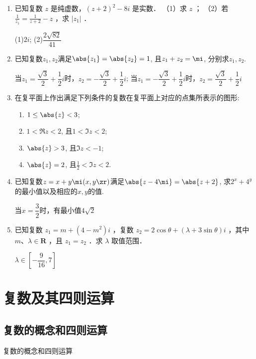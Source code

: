 \begin{enumerate}
\item 已知复数 $z$ 是纯虚数，$(z+2)^2-8 i$ 是实数．
（1）求 $z$ ；
（2）若 $\frac{1}{z_1}=\frac{1}{z+2}-z$ ，求 $\left|z_1\right|$ ．
\begin{jieda}
    (1)$2i$; (2)$\dfrac{2\sqrt{82}}{41}$
\end{jieda}

\item 已知复数$z_1,z_2$满足$\abs{z_1}=\abs{z_2}=1$, 且$z_1+z_2=\mi$, 分别求$z_1,z_2$. 
\begin{jieda}
    当$z_1=\dfrac{\sqrt{3}}{2}+\dfrac{1}{2}i$时，$z_2=-\dfrac{\sqrt{3}}{2}+\dfrac{1}{2}i$;
     当$z_1=-\dfrac{\sqrt{3}}{2}+\dfrac{1}{2}i$时，$z_2=\dfrac{\sqrt{3}}{2}+\dfrac{1}{2}i$
\end{jieda}

\item 在复平面上作出满足下列条件的复数在复平面上对应的点集所表示的图形: 
\begin{enumerate}[(1)]
\item $1\leq\abs{z}<3$; 
\item $1<\Re{z}<2$, 且$1<\Im{z}<2$; 
\item $\abs{z}>3$, 且$\Im{z}<-1$; 
\item $\abs{z}=2$, 且$\frac{1}{2}<\Im{z}<2$. 
\end{enumerate}

\item 已知复数$z=x+y\mi(x,y\zr)$满足$\abs{z-4\mi}=\abs{z+2}$, 求$2^x+4^y$的最小值以及相应的$x,y$的值. 
\begin{jieda}
    当$x=\dfrac{3}{2}$时，有最小值$4\sqrt{2}$
\end{jieda}

\item 已知复数 $z_1=m+\left(4-m^2\right) i$ ，复数 $z_2=2 \cos \theta+(\lambda+3 \sin \theta) i$ ，其中 $m 、 \lambda \in \mathbf{R}$ ，且 $z_1=z_2$ ．求 $\lambda$ 取值范围．
\begin{jieda}
    $\lambda \in [-\dfrac{9}{16},7]$
\end{jieda}
\end{enumerate}

\section{复数及其四则运算}
\subsection{复数的概念和四则运算}
\zsd 复数的概念和四则运算 \\


